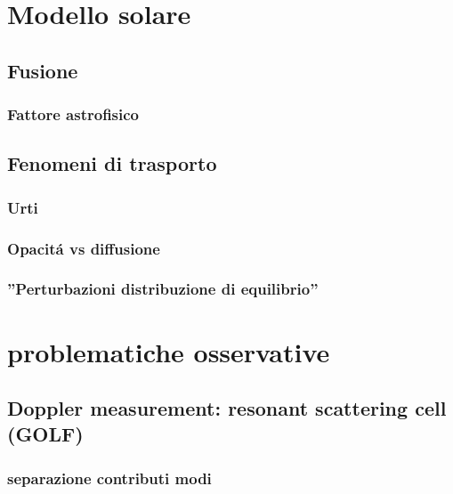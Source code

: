 \documentclass[../main.tex]{subfiles}
\begin{document}
\chapter{Modello solare}

\section{Fusione}

\subsection{Fattore astrofisico}

\section{Fenomeni di trasporto}

\begin{refsection}

\nocite{*}

\begingroup
\let\clearpage\relax
{}
\endgroup


\subsection{Urti}

\subsection{Opacit\'a vs diffusione}

\subsection{''Perturbazioni distribuzione di equilibrio''}


\end{refsection}


\chapter{problematiche osservative}

\section{Doppler measurement: resonant scattering cell (GOLF)}

\subsection{separazione contributi modi}
\end{document}
